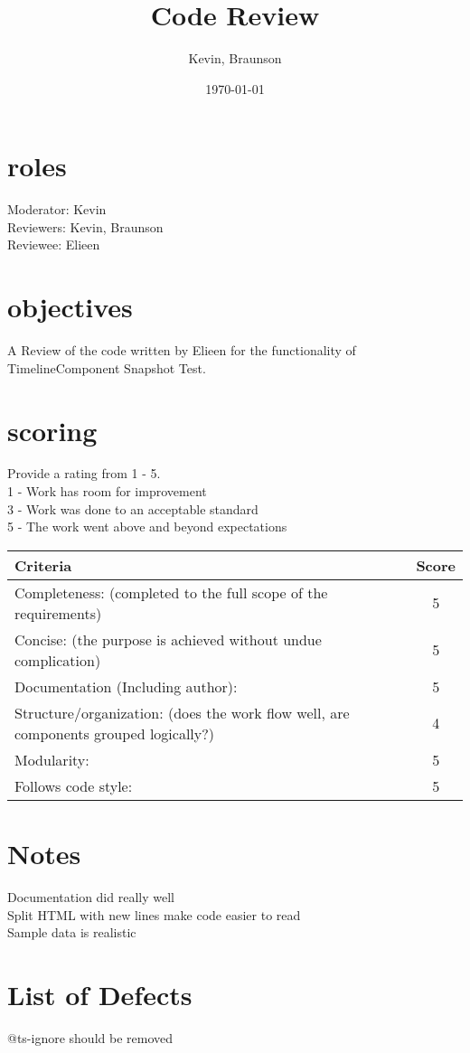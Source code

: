 \documentclass{article}
\title{Code Review}
\author{Kevin, Braunson}
\date{\today}
\begin{document}
\maketitle

\section{roles}
Moderator: Kevin \\
Reviewers: Kevin, Braunson\\
Reviewee: Elieen\\

\section{objectives}
A Review of the code written by Elieen for the functionality of TimelineComponent Snapshot Test. 


\section{scoring}
    Provide a rating from 1 - 5. \\
    1 - Work has room for improvement \\
    3 - Work was done to an acceptable standard \\
    5 - The work went above and beyond expectations\\

\begin{tabular}{|l|c|}
	\hline
	Criteria & Score\\
	\hline
    Completeness:
    (completed to the full scope of the requirements) & 5 \\
	\hline
    Concise:
    (the purpose is achieved without undue complication) & 5 \\
	\hline
    Documentation (Including author): & 5\\
    \hline
    Structure/organization:
    (does the work flow well, are components grouped logically?) & 4\\
    \hline
    Modularity: & 5\\
    \hline
    Follows code style: & 5\\
    \hline
\end{tabular}

\section{Notes}

Documentation did really well\\
Split HTML with new lines make code easier to read\\
Sample data is realistic\\

\pagebreak

\section{List of Defects}
@ts-ignore should be removed\\
\end{document}
